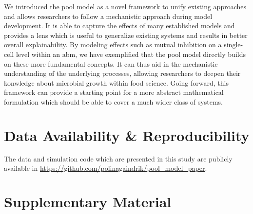 \documentclass[10pt,A4paper]{article}
\numberwithin{equation}{section}
\newcommand{\beginsupplement}{%
  \renewcommand{\thesection}{}
  \setcounter{subsection}{0}
  \renewcommand{\thesubsection}{S\arabic{subsection}}
  \setcounter{table}{0}
  \renewcommand{\thetable}{S\arabic{table}}%
  \setcounter{figure}{0}
  \renewcommand{\thefigure}{S\arabic{figure}}%
  \setcounter{listing}{0}
  \renewcommand{\thelisting}{S\arabic{listing}}
}
\begin{document}
We introduced the pool model as a novel framework to unify existing approaches and allows researchers to follow a mechanistic approach during model development.
It is able to capture the effects of many established models and provides a lens which is useful to generalize existing systems and results in better overall explainability.
By modeling effects such as mutual inhibition on a single-cell level within an \ac{abm}, we have exemplified that the pool model directly builds on these more fundamental concepts.
It can thus aid in the mechanistic understanding of the underlying processes, allowing researchers to deepen their konwledge about microbial growth within food science.
Going forward, this framework can provide a starting point for a more abstract mathematical formulation which should be able to cover a much wider class of systems.

\onecolumn

\newpage
\section*{Data Availability \& Reproducibility}

The data and simulation code which are presented in this study are publicly available in
\url{https://github.com/polinagaindrik/pool_model_paper}.

\printbibliography

\newpage
\beginsupplement
\section{Supplementary Material}
\end{document}
